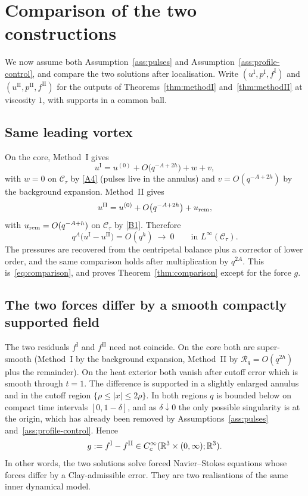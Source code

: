\section{Comparison of the two constructions}
\label{sec:comparison}

We now assume both Assumption~\ref{ass:pulses} and Assumption~\ref{ass:profile-control}, and compare the two solutions after localisation. Write $(u^{\mathrm I},p^{\mathrm I},f^{\mathrm I})$ and $(u^{\mathrm{II}},p^{\mathrm{II}},f^{\mathrm{II}})$ for the outputs of Theorems~\ref{thm:methodI} and~\ref{thm:methodII} at viscosity $1$, with supports in a common ball.

\subsection{Same leading vortex}

On the core, Method~I gives
\[
u^{\mathrm I}=u^{(0)}+O\bigl(q^{-A+2h}\bigr)+w+v,
\]
with $w=0$ on $\mathcal C_\tau$ by \ref{A4} (pulses live in the annulus) and $v=O(q^{-A+2h})$ by the background expansion. Method~II gives
\[
u^{\mathrm{II}}=u^{(0)}+O\bigl(q^{-A+2h}\bigr)+u_{\mathrm{rem}},
\]
with $u_{\mathrm{rem}}=O(q^{-A+h})$ on $\mathcal C_\tau$ by \ref{B1}. Therefore
\[
q^{A}\bigl(u^{\mathrm I}-u^{\mathrm{II}}\bigr)
=O(q^{h})\ \longrightarrow\ 0
\qquad\text{in }L^\infty(\mathcal C_\tau).
\]
The pressures are recovered from the centripetal balance plus a corrector of lower order, and the same comparison holds after multiplication by $q^{2A}$. This is~\eqref{eq:comparison}, and proves Theorem~\ref{thm:comparison} except for the force $g$.

\subsection{The two forces differ by a smooth compactly supported field}

The two residuals $f^{\mathrm I}$ and $f^{\mathrm{II}}$ need not coincide. On the core both are super-smooth (Method~I by the background expansion, Method~II by $\mathcal R_q=O(q^{2h})$ plus the remainder). On the heat exterior both vanish after cutoff error which is smooth through $t=1$. The difference is supported in a slightly enlarged annulus and in the cutoff region $\{ \rho\le |x|\le 2\rho\}$. In both regions $q$ is bounded below on compact time intervals $[0,1-\delta]$, and as $\delta\downarrow 0$ the only possible singularity is at the origin, which has already been removed by Assumptions~\ref{ass:pulses} and~\ref{ass:profile-control}. Hence
\[
g:=f^{\mathrm I}-f^{\mathrm{II}}
\in C_c^\infty(\mathbb{R}^3\times(0,\infty);\mathbb{R}^3).
\]
In other words, the two solutions solve forced {N}avier--{S}tokes equations whose forces differ by a {C}lay-admissible error. They are two realisations of the same inner dynamical model.

